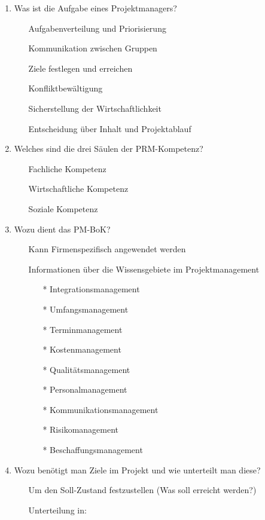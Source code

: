 \documentclass[12pt,a4paper]{article}
\begin{document}
\begin{enumerate}
\item Was ist die Aufgabe eines Projektmanagers?
	\begin{enumerate}
	\item[] Aufgabenverteilung und Priorisierung 
	\item[] Kommunikation zwischen Gruppen 
	\item[] Ziele festlegen und erreichen  
	\item[] Konfliktbewältigung 
	\item[] Sicherstellung der Wirtschaftlichkeit  
	\item[] Entscheidung über Inhalt und Projektablauf 
	\end{enumerate}
\item Welches sind die drei Säulen der PRM-Kompetenz?
	\begin{enumerate}
	\item[] Fachliche Kompetenz 
	\item[] Wirtschaftliche Kompetenz 
	\item[] Soziale Kompetenz
	\end{enumerate}
\item Wozu dient das PM-BoK?
	\begin{enumerate}
	\item[] Kann Firmenspezifisch angewendet werden 
	\item[] Informationen über die Wissensgebiete im Projektmanagement  
		\begin{enumerate}
		\item[*] Integrationsmanagement
		\item[*] Umfangsmanagement
		\item[*] Terminmanagement
		\item[*] Kostenmanagement
		\item[*] Qualitätsmanagement
		\item[*] Personalmanagement
		\item[*] Kommunikationsmanagement
		\item[*] Risikomanagement
		\item[*] Beschaffungsmanagement
		\end{enumerate}
	\end{enumerate}
\item Wozu benötigt man Ziele im Projekt und wie unterteilt man diese?
	\begin{enumerate}
	\item[] Um den Soll-Zustand festzustellen (Was soll erreicht werden?) 
	\item[] Unterteilung in: 

\end{enumerate}
\end{enumerate}
\end{document}
